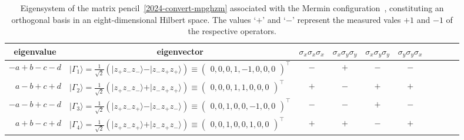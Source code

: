 \documentclass[
  twocolumn,
 showpacs,
 showkeys,
 preprintnumbers,
 amsmath,amssymb,
 aps,
 prl,
  longbibliography,
 floatfix,
 ]{revtex4-2}
\newcommand\myotimes{ }
\begin{document}
\begin{table*}[ht]
\caption{\label{2024-convert-mpghzm-es}Eigensystem of the matrix pencil~\eqref{2024-convert-mpghzm} associated with the Mermin configuration~\cite{mermin,mermin90b}, constituting an orthogonal basis in an eight-dimensional Hilbert space.
The values `$\boldsymbol{+}$' and `$\boldsymbol{-}$' represent the measured vales $+1$ and $-1$ of the respective operators.
}
\centering
\begin{ruledtabular}
\begin{tabular}{rlcccccccc}
 \multicolumn{1}{c}{eigenvalue} & \multicolumn{1}{c}{eigenvector} & $\sigma_x \myotimes  \sigma_x \myotimes  \sigma_x$ & $\sigma_x \myotimes  \sigma_y \myotimes  \sigma_y$ & $\sigma_x \myotimes  \sigma_y \myotimes  \sigma_y$ & $\sigma_y \myotimes  \sigma_y \myotimes  \sigma_x$ \\
\hline
   $-a + b - c - d $ &          $ \vert \Gamma_1 \rangle = \frac{1}{\sqrt{2}}\left( \vert z_+z_-z_- \rangle  - \vert z_-z_+z_+ \rangle \right) \equiv \begin{pmatrix}          0, 0, 0, 1, -1, 0, 0, 0            \end{pmatrix}^\intercal  $  &   $\boldsymbol{-}$ &  $\boldsymbol{+}$  & $\boldsymbol{-}$   & $\boldsymbol{-}$        \\
   $a - b + c + d  $&           $ \vert \Gamma_2 \rangle = \frac{1}{\sqrt{2}}\left( \vert z_+z_-z_- \rangle  + \vert z_-z_+z_+ \rangle \right) \equiv \begin{pmatrix}          0, 0, 0, 1, 1, 0, 0, 0            \end{pmatrix}^\intercal   $  &   $\boldsymbol{+}$ &  $\boldsymbol{-}$  & $\boldsymbol{+}$   & $\boldsymbol{+}$       \\
   $-a - b + c - d $ &          $ \vert \Gamma_3 \rangle = \frac{1}{\sqrt{2}}\left( \vert z_+z_-z_+ \rangle  - \vert z_-z_+z_- \rangle \right) \equiv \begin{pmatrix}          0, 0, 1, 0, 0, -1, 0, 0            \end{pmatrix}^\intercal  $  &   $\boldsymbol{-}$ &  $\boldsymbol{-}$  & $\boldsymbol{+}$   & $\boldsymbol{-}$        \\
   $a + b - c + d  $&           $ \vert \Gamma_4 \rangle = \frac{1}{\sqrt{2}}\left( \vert z_+z_-z_+ \rangle  + \vert z_-z_+z_- \rangle \right) \equiv \begin{pmatrix}          0, 0, 1, 0, 0, 1, 0, 0            \end{pmatrix}^\intercal   $  &   $\boldsymbol{+}$ &  $\boldsymbol{+}$  & $\boldsymbol{-}$   & $\boldsymbol{+}$       \\

\end{tabular}
\end{ruledtabular}
\end{table*}
\end{document}
